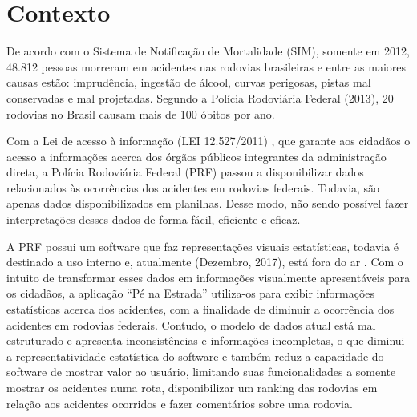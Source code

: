 \section[Contexto]{Contexto}

De acordo com o Sistema de Notificação de Mortalidade (SIM), somente em 2012,
48.812 pessoas morreram em acidentes nas rodovias brasileiras e entre as maiores causas
estão: imprudência, ingestão de álcool, curvas perigosas, pistas mal conservadas e mal
projetadas. Segundo a Polícia Rodoviária Federal (2013), 20 rodovias no Brasil causam
mais de 100 óbitos por ano.

Com a Lei de acesso à informação (LEI 12.527/2011) \cite{brasil11}, que garante
aos cidadãos o acesso a informações acerca dos órgãos públicos integrantes da
administração direta, a Polícia Rodoviária Federal (PRF) passou a disponibilizar dados
relacionados às ocorrências dos acidentes em rodovias federais. Todavia, são apenas
dados disponibilizados em planilhas. Desse modo, não sendo possível fazer interpretações
desses dados de forma fácil, eficiente e eficaz.

A PRF possui um software que faz representações visuais estatísticas, todavia é
destinado a uso interno e, atualmente (Dezembro, 2017), está fora do ar . Com o intuito de
transformar esses dados em informações visualmente apresentáveis para os cidadãos, a
aplicação “Pé na Estrada” utiliza-os para exibir informações estatísticas acerca dos
acidentes, com a finalidade de diminuir a ocorrência dos acidentes em rodovias federais.
Contudo, o modelo de dados atual está mal estruturado e apresenta inconsistências e
informações incompletas, o que diminui a representatividade estatística do software e
também reduz a capacidade do software de mostrar valor ao usuário, limitando suas
funcionalidades a somente mostrar os acidentes numa rota, disponibilizar um ranking das
rodovias em relação aos acidentes ocorridos e fazer comentários sobre uma rodovia.
